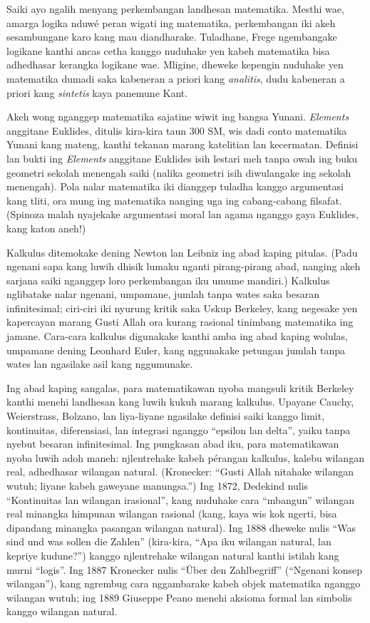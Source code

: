 \documentclass[../../../include/open-logic-section]{subfiles}
\begin{document}
Saiki ayo ngalih menyang perkembangan landhesan
matematika. Mesthi wae, amarga logika nduwé peran
wigati ing matematika, perkembangan iki akeh
sesambungane karo kang mau diandharake. Tuladhane,
Frege ngembangake logikane kanthi ancas cetha
kanggo nuduhake yen kabeh matematika bisa
adhedhasar kerangka logikane wae. Mligine, dheweke
kepengin nuduhake yen matematika dumadi saka
kabeneran a priori kang \emph{analitis}, dudu
kabeneran a priori kang \emph{sintetis} kaya
panemune Kant.

Akeh wong nganggep matematika sajatine wiwit
ing bangsa Yunani. \emph{Elements} anggitane
Euklides, ditulis kira-kira taun 300 SM, wis dadi
conto matematika Yunani kang mateng, kanthi
tekanan marang katelitian lan kecermatan.
Definisi lan bukti ing \emph{Elements} anggitane
Euklides isih lestari meh tanpa owah ing buku
geometri sekolah menengah saiki (nalika geometri
isih diwulangake ing sekolah menengah). Pola
nalar matematika iki dianggep tuladha kanggo
argumentasi kang tliti, ora mung ing matematika
nanging uga ing cabang-cabang filsafat. (Spinoza
malah nyajekake argumentasi moral lan agama
nganggo gaya Euklides, kang katon aneh!)

Kalkulus ditemokake dening Newton lan Leibniz ing
abad kaping pitulas. (Padu ngenani sapa kang luwih
dhisik lumaku nganti pirang-pirang abad, nanging
akeh sarjana saiki nganggep loro perkembangan iku
umume mandiri.) Kalkulus nglibatake nalar ngenani,
umpamane, jumlah tanpa wates saka besaran
infinitesimal; ciri-ciri iki nyurung
kritik saka Uskup Berkeley, kang negesake yen
kapercayan marang Gusti Allah ora kurang rasional
tinimbang matematika ing jamane. Cara-cara
kalkulus digunakake kanthi amba ing abad kaping
wolulas, umpamane dening Leonhard Euler, kang
nggunakake petungan jumlah tanpa wates lan
ngasilake asil kang nggumunake.

Ing abad kaping sangalas, para matematikawan
nyoba mangsuli kritik Berkeley kanthi menehi
landhesan kang luwih kukuh marang kalkulus.
Upayane Cauchy, Weierstrass, Bolzano, lan liya-liyane
ngasilake definisi saiki kanggo limit, kontinuitas,
diferensiasi, lan integrasi nganggo ``epsilon lan
delta'', yaiku tanpa nyebut besaran infinitesimal.
Ing pungkasan abad iku, para matematikawan nyoba
luwih adoh maneh: njlentrehake kabeh pérangan
kalkulus, kalebu wilangan real, adhedhasar wilangan
natural. (Kronecker: ``Gusti Allah nitahake wilangan
wutuh; liyane kabeh gaweyane manungsa.'') Ing 1872,
Dedekind nulis ``Kontinuitas lan wilangan irasional'',
kang nuduhake cara ``mbangun'' wilangan real minangka
himpunan wilangan rasional (kang, kaya wis kok ngerti,
bisa dipandang minangka pasangan wilangan natural).
Ing 1888 dheweke nulis ``Was sind und was sollen die
Zahlen'' (kira-kira, ``Apa iku wilangan natural, lan
kepriye kudune?'') kanggo njlentrehake wilangan
natural kanthi istilah kang murni ``logis''. Ing 1887
Kronecker nulis ``\"Uber den Zahlbegriff''
(``Ngenani konsep wilangan''), kang ngrembug cara
nggambarake kabeh objek matematika nganggo
wilangan wutuh; ing 1889 Giuseppe Peano menehi
aksioma formal lan simbolis kanggo wilangan natural.
\end{document}
